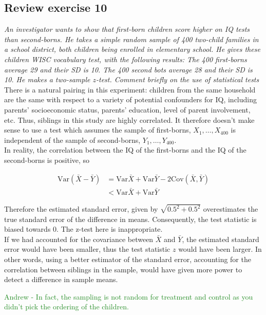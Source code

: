 \documentclass[11pt]{article}
\newcommand{\var}{\textrm{Var}}
\newcommand{\cov}{\textrm{Cov}}
\begin{document}
\subsection*{Review exercise 10} %
\noindent \textit{An investigator wants to show that first-born children score higher on IQ tests than second-borns. He takes a simple random sample of 400 two-child families in a school district, both children being enrolled in elementary school. He gives these children WISC vocabulary test, with the following results: The 400 first-borns average 29 and their SD is 10. The 400 second bots average 28 and their SD is 10. He makes a two-sample $z$-test. Comment briefly on the use of statistical tests}\\

There is a natural pairing in this experiment: children from the same household are the same with respect to a variety of potential confounders for IQ, including parents' socioeconomic status, parents' education, level of parent involvement, etc.  Thus, siblings in this study are highly correlated.  It therefore doesn't make sense to use a test which assumes the sample of first-borns, $X_1, \dots, X_{400}$ is independent of the sample of second-borns, $Y_1, \dots, Y_{400}$.  \\

In reality, the correlation between the IQ of the first-borns and the IQ of the second-borns is positive, so

\begin{align*}
\var(\bar{X} - \bar{Y}) &= \var{\bar{X}} + \var{\bar{Y}} - 2\cov(\bar{X},\bar{Y}) \\
&< \var{\bar{X}} + \var{\bar{Y}} 
\end{align*}

Therefore the estimated standard error, given by $\sqrt{0.5^2 + 0.5^2}$ overestimates the true standard error of the difference in means.  Consequently, the test statistic is biased towards $0$.  The z-test here is inappropriate. \\

If we had accounted for the covariance between $\bar{X}$ and $\bar{Y}$, the estimated standard error would have been smaller, thus the test statistic $z$ would have been larger.  In other words, using a better estimator of the standard error, accounting for the correlation between siblings in the sample, would have given more power to detect a difference in sample means.

\textcolor{ForestGreen}{Andrew - In fact, the sampling is not random for treatment and control as you didn't pick the ordering of the children.}
\end{document}
